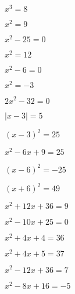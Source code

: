 \begin{bbwAufgabenBlock}
\item $x^3=8$

\item $x^2 = 9$

\item $x^2-25 = 0$

\item $x^2 = 12$

\item $x^2 - 6 = 0$

\item $x^2=-3$
\LoesungsBlock{$\lx=\{ \}$}

\item $2x^2-32 = 0$

\item $|x-3| = 5$

\item $(x-3)^2 = 25 $

\item $x^2-6x+9 = 25$

\item $(x-6)^2 = -25 $
\LoesungsBlock{$\lx = \left\{ \right\}$}

\item $(x+6)^2 = 49$

\item $x^2+12x+36 = 9 $

\item $x^2-10x+25 = 0  $
\LoesungsBlock{$\lx = \left\{ -5 \right\}$}

\item $x^2 + 4x +4 = 36$

\item $x^2+4x+5 = 37$

\item $x^2 -12 x + 36 = 7$

\item $ x^2 - 8x + 16= -5$
\LoesungsBlock{$\lx = \left\{ \right\}$}


\end{bbwAufgabenBlock}
